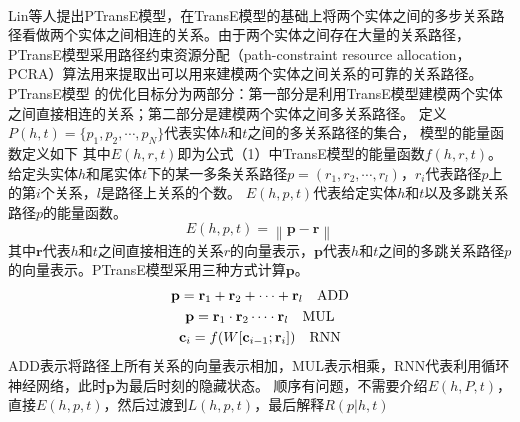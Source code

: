 \documentclass[twocolumn]{article}
\newcommand{\upcite}[1]{\textsuperscript{\textsuperscript{\cite{#1}}}}
\begin{document}
Lin等人\upcite{PTransE}提出PTransE模型，在TransE模型的基础上将两个实体之间的多步关系路径看做两个实体之间相连的关系。由于两个实体之间存在大量的关系路径，PTransE模型采用路径约束资源分配（path-constraint resource allocation，PCRA）算法用来提取出可以用来建模两个实体之间关系的可靠的关系路径。PTransE模型
的优化目标分为两部分：第一部分是利用TransE模型建模两个实体之间直接相连的关系；第二部分是建模两个实体之间多关系路径。
定义$P(h,t)=\{p_1,p_2,\cdots,p_N\}$代表实体$h$和$t$之间的多关系路径的集合，
模型的能量函数定义如下
其中$E(h,r,t)$即为公式（1）中TransE模型的能量函数$f(h,r,t)$。
给定头实体$h$和尾实体$t$下的某一多条关系路径$p=(r_1,r_2,\cdots,r_l)$，$r_i$代表路径$p$上的第$i$个关系，$l$是路径上关系的个数。
$E(h,p,t)$代表给定实体$h$和$t$以及多跳关系路径$p$的能量函数。
\begin{equation}
	E(h,p,t)=\left \| \textbf{p}-\textbf{r} \right \|
\end{equation}
其中$\textbf{r}$代表$h$和$t$之间直接相连的关系$r$的向量表示，$\textbf{p}$代表$h$和$t$之间的多跳关系路径$p$的向量表示。PTransE模型采用三种方式计算$\textbf{p}$。
\begin{gather}
	\textbf{p}=\textbf{r}_1+\textbf{r}_2+\cdots+\textbf{r}_l \quad \text{ADD}\notag \\
	\textbf{p}=\textbf{r}_1\cdot\textbf{r}_2\cdots\cdot\textbf{r}_l \quad \text{MUL}\notag \\
	\textbf{c}_i=f(W[\textbf{c}_{i-1};\textbf{r}_i]) \quad \text{RNN} \notag
\end{gather}
ADD表示将路径上所有关系的向量表示相加，MUL表示相乘，RNN代表利用循环神经网络，此时$\textbf{p}$为最后时刻的隐藏状态。
顺序有问题，不需要介绍$E(h,P,t)$，直接$E(h,p,t)$，然后过渡到$L(h,p,t)$，最后解释$R(p|h,t)$



\printbibliography
\end{document}
